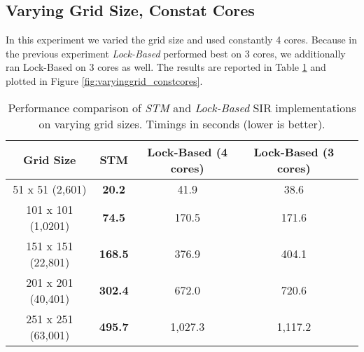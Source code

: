 
\subsection{Varying Grid Size, Constat Cores}
In this experiment we varied the grid size and used constantly 4 cores. Because in the previous experiment \textit{Lock-Based} performed best on 3 cores, we additionally ran Lock-Based on 3 cores as well. %
The results are reported in Table \ref{tab:varyinggrid_constcores} and plotted in Figure \ref{fig:varyinggrid_constcores}.

\begin{table}
	\centering
  	\begin{tabular}{ c || c | c | c | c }
        Grid Size          & STM              & Lock-Based (4 cores) & Lock-Based (3 cores) \\ \hline \hline 
   		51 x 51 (2,601)    & \textbf{20.2}    & 41.9                 & 38.6                 \\ \hline
   		101 x 101 (1,0201) & \textbf{74.5}    & 170.5                & 171.6                \\ \hline
   		151 x 151 (22,801) & \textbf{168.5}   & 376.9                & 404.1                \\ \hline
   		201 x 201 (40,401) & \textbf{302.4}   & 672.0                & 720.6                \\ \hline
   		251 x 251 (63,001) & \textbf{495.7}   & 1,027.3              & 1,117.2              \\ \hline \hline
  	\end{tabular}

  	\caption{Performance comparison of \textit{STM} and \textit{Lock-Based} SIR implementations on varying grid sizes. Timings in seconds (lower is better).}
	\label{tab:varyinggrid_constcores}
\end{table}

